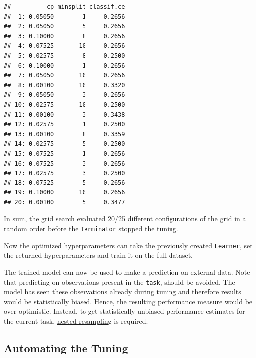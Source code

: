 \documentclass[]{scrbook}
\newenvironment{Shaded}{\begin{snugshade}}{\end{snugshade}}
\newcommand{\KeywordTok}[1]{\textcolor[rgb]{0.13,0.29,0.53}{\textbf{#1}}}
\newcommand{\NormalTok}[1]{#1}
\newcommand{\OperatorTok}[1]{\textcolor[rgb]{0.81,0.36,0.00}{\textbf{#1}}}
\newcommand{\StringTok}[1]{\textcolor[rgb]{0.31,0.60,0.02}{#1}}
\renewenvironment{Shaded} {\begin{snugshade}\small} {\end{snugshade}}
\begin{document}
\begin{verbatim}
##          cp minsplit classif.ce
##  1: 0.05050        1     0.2656
##  2: 0.05050        5     0.2656
##  3: 0.10000        8     0.2656
##  4: 0.07525       10     0.2656
##  5: 0.02575        8     0.2500
##  6: 0.10000        1     0.2656
##  7: 0.05050       10     0.2656
##  8: 0.00100       10     0.3320
##  9: 0.05050        3     0.2656
## 10: 0.02575       10     0.2500
## 11: 0.00100        3     0.3438
## 12: 0.02575        1     0.2500
## 13: 0.00100        8     0.3359
## 14: 0.02575        5     0.2500
## 15: 0.07525        1     0.2656
## 16: 0.07525        3     0.2656
## 17: 0.02575        3     0.2500
## 18: 0.07525        5     0.2656
## 19: 0.10000       10     0.2656
## 20: 0.00100        5     0.3477
\end{verbatim}

In sum, the grid search evaluated 20/25 different configurations of the grid in a random order before the \href{https://mlr3tuning.mlr-org.com/reference/Terminator.html}{\texttt{Terminator}} stopped the tuning.

Now the optimized hyperparameters can take the previously created \href{https://mlr3.mlr-org.com/reference/Learner.html}{\texttt{Learner}}, set the returned hyperparameters and train it on the full dataset.

\begin{Shaded}
\end{Shaded}

The trained model can now be used to make a prediction on external data.
Note that predicting on observations present in the \texttt{task}, should be avoided.
The model has seen these observations already during tuning and therefore results would be statistically biased.
Hence, the resulting performance measure would be over-optimistic.
Instead, to get statistically unbiased performance estimates for the current task, \protect\hyperlink{nested-resamling}{nested resampling} is required.

\hypertarget{autotuner}{%
\subsection{Automating the Tuning}\label{autotuner}}
\end{document}
